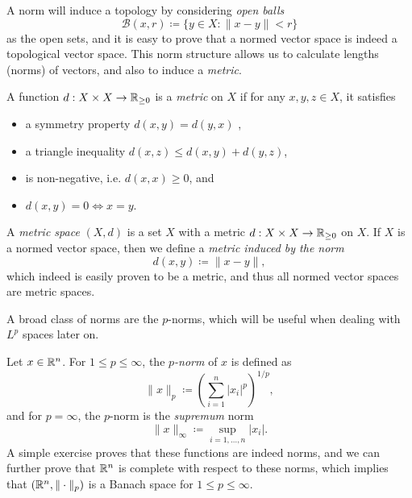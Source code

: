 A norm will induce a topology by considering \emph{open balls}
\begin{equation}
    \mathcal{B}(x,r) \coloneqq \{y\in X: \|x-y\|<r\}
\end{equation}
as the open sets, and it is easy to prove that a normed vector space is indeed a topological vector space. This norm structure allows us to calculate lengths (norms) of vectors, and also to induce a \emph{metric}.
\begin{definition}
    A function $d:X\times X\to \mathbb{R}_{\geq 0}$ is a \emph{metric} on $X$ if for any $x,y,z\in X$, it satisfies
    \begin{itemize}
        \item a symmetry property $d(x,y) = d(y,x)$ ,
        \item a triangle inequality $d(x,z) \leq d(x,y) + d(y,z)$,
        \item is non-negative, i.e. $d(x,x) \geq 0$, and
        \item $d(x,y) = 0 \iff x=y$.
    \end{itemize}
    A \emph{metric space} $(X,d)$ is a set $X$ with a metric $d:X\times X\to \mathbb{R}_{\geq 0}$ on $X$. If $X$ is a normed vector space, then we define a \emph{metric induced by the norm} 
    \begin{equation}
        d(x,y) \coloneqq \|x-y\|,
    \end{equation}
    which indeed is easily proven to be a metric, and thus all normed vector spaces are metric spaces. 
\end{definition}
A broad class of norms are the $p$-norms, which will be useful when dealing with $L^p$ spaces later on. 
\begin{definition}
    Let $x\in\mathbb{R}^n$. For $1\leq p\leq \infty$, the \emph{$p$-norm} of $x$ is defined as 
    \begin{equation}
        \|x\|_p \coloneqq \left(\sum_{i=1}^n |x_i|^p\right)^{1/p},
    \end{equation}
    and for $p=\infty$, the $p$-norm is the \emph{supremum} norm
    \begin{equation}
        \|x\|_\infty \coloneqq \sup_{i=1,\dots,n} |x_i|.
    \end{equation}
    A simple exercise proves that these functions are indeed norms, and we can further prove that $\mathbb{R}^n$ is complete with respect to these norms, which implies that $(\mathbb{R}^n, \|\cdot\|_p)$ is a Banach space for $1\leq p\leq \infty$.
\end{definition}
